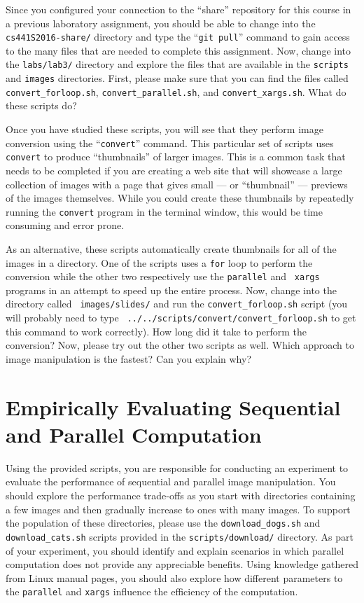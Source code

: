Since you configured your connection to the ``share'' repository for this course in a previous laboratory assignment,
you should be able to change into the {\tt cs441S2016-share/} directory and type the ``{\tt git pull}'' command to gain
access to the many files that are needed to complete this assignment. Now, change into the {\tt labs/lab3/} directory
and explore the files that are available in the {\tt scripts} and {\tt images} directories. First, please make sure that
you can find the files called {\tt convert\_forloop.sh}, {\tt convert\_parallel.sh}, and {\tt convert\_xargs.sh}. What
do these scripts do?

Once you have studied these scripts, you will see that they perform image conversion using the ``{\tt convert}''
command.  This particular set of scripts uses {\tt convert} to produce ``thumbnails'' of larger images. This is a common
task that needs to be completed if you are creating a web site that will showcase a large collection of images with a
page that gives small --- or ``thumbnail'' --- previews of the images themselves. While you could create these
thumbnails by repeatedly running the {\tt convert} program in the terminal window, this would be time consuming and
error prone.

As an alternative, these scripts automatically create thumbnails for all of the images in a directory. One of the
scripts uses a {\tt for} loop to perform the conversion while the other two respectively use the {\tt parallel} and {\tt
  xargs} programs in an attempt to speed up the entire process. Now, change into the directory called {\tt
  images/slides/} and run the {\tt convert\_forloop.sh} script (you will probably need to type {\tt
../../scripts/convert/convert\_forloop.sh} to get this command to work correctly). How long did it take to perform the
conversion? Now, please try out the other two scripts as well. Which approach to image manipulation is the fastest? Can
you explain why?

\section*{Empirically Evaluating Sequential and Parallel Computation}

Using the provided scripts, you are responsible for conducting an experiment to evaluate the performance of sequential
and parallel image manipulation. You should explore the performance trade-offs as you start with directories containing
a few images and then gradually increase to ones with many images. To support the population of these directories,
please use the {\tt download\_dogs.sh} and {\tt download\_cats.sh} scripts provided in the {\tt scripts/download/}
directory. As part of your experiment, you should identify and explain scenarios in which parallel computation does not
provide any appreciable benefits. Using knowledge gathered from Linux manual pages, you should also explore how
different parameters to the {\tt parallel} and {\tt xargs} influence the efficiency of the computation.

